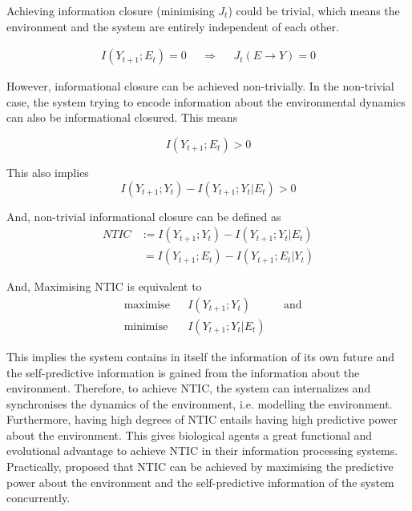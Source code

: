 \documentclass[utf8]{article}
\begin{document}
			\noindent 
			Achieving information closure (minimising $J_t$) could be trivial, which means the environment and the system are entirely independent of each other.
			
				\begin{equation}
				\begin{aligned}
				{I(Y_{t+1};E_{t})=0}&&{\Rightarrow}&&{J_{t}(E \rightarrow Y )=0}
				\end{aligned}
				\end{equation}


			\noindent 
			However, informational closure can be achieved non-trivially. In the non-trivial case, the system trying to encode information about the environmental dynamics can also be informational closured. This means
			
				\begin{equation}
				I(Y_{t+1};E_{t}) > 0
				\end{equation}
			
			\noindent
			This also implies
				\begin{equation}
					I(Y_{t+1};Y_{t})-I(Y_{t+1};Y_{t}|E_{t}) > 0
				\end{equation}
			
			
			
			\noindent 
			And, non-trivial informational closure can be defined as 		
				\begin{equation}
				\left.\begin{array}
				{rl}{NTIC} & {:=I(Y_{t+1};Y_{t})-I(Y_{t+1};Y_{t}|E_{t})}\\
				{ } & {\ =I(Y_{t+1};E_{t})-I(Y_{t+1};E_{t}|Y_{t})}
				\end{array} \right.
				\end{equation}
				
				
			\noindent 
			And, Maximising NTIC is equivalent to
				\begin{equation}\label{eq:nticObjective}
				\begin{aligned}
				& \text{maximise} & { } & I(Y_{t+1};Y_{t}) & { } & \text{and} \\
				& \text{minimise} & { } & I(Y_{t+1};Y_{t}|E_{t}) & { }
				\end{aligned}
				\end{equation}
				
			\noindent
			This implies the system contains in itself the information of its own future and the self-predictive information is gained from the information about the environment. Therefore, to achieve NTIC, the system can internalizes and synchronises the dynamics of the environment, i.e. modelling the environment. Furthermore, having high degrees of NTIC entails having high predictive power about the environment. This gives biological agents a great functional and evolutional advantage to achieve NTIC in their information processing systems. Practically, \cite{guttenberg2016neural} proposed that NTIC can be achieved by maximising the predictive power about the environment and the self-predictive information of the system concurrently.
			
\end{document}
